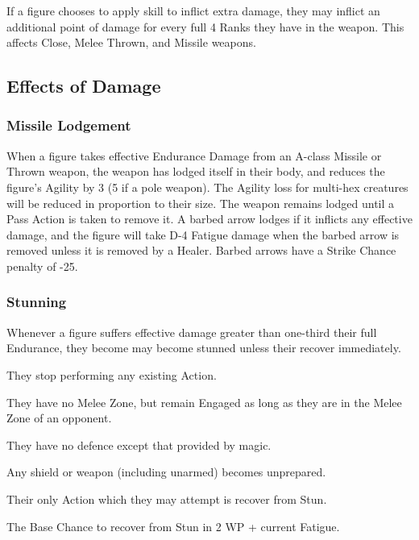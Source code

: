 \begin{multicols*}{3}
If a figure chooses to apply skill to inflict extra damage, they may
inflict an additional point of damage for every full 4 Ranks they have
in the weapon. This affects Close, Melee Thrown, and Missile weapons.

\subsection{Effects of Damage}

\subsubsection{Missile Lodgement}

When a figure takes effective Endurance Damage from an A-class Missile
or Thrown weapon, the weapon has lodged itself in their body, and
reduces the figure's Agility by 3 (5 if a pole weapon). The Agility
loss for multi-hex creatures will be reduced in proportion to their
size. The weapon remains lodged until a Pass Action is taken to remove
it. A barbed arrow lodges if it inflicts any effective damage, and the
figure will take D-4 Fatigue damage when the barbed arrow is removed
unless it is removed by a Healer. Barbed arrows have a Strike Chance
penalty of -25.

\subsubsection{Stunning}

Whenever a figure suffers effective damage greater than one-third
their full Endurance, they become may become stunned unless their
recover immediately.
\begin{Itemize}

\item They stop performing any existing Action.

\item They have no Melee Zone, but remain Engaged as long as they are
in the Melee Zone of an opponent.

\item They have no defence except that provided by magic.

\item Any shield or weapon (including unarmed) becomes unprepared. 

\item Their only Action which they may attempt is recover from Stun.

\item The Base Chance to recover from Stun in 2 \x WP + current Fatigue.


\end{Itemize}
\end{multicols*}

